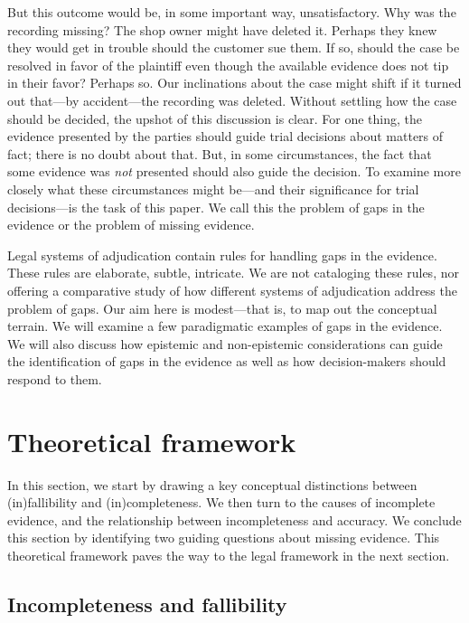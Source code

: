 \documentclass[
  10pt,
  dvipsnames,enabledeprecatedfontcommands]{scrartcl}
\begin{document}
But this outcome would be, in some important way, unsatisfactory. Why
was the recording missing? The shop owner might have deleted it. Perhaps
they knew they would get in trouble should the customer sue them. If so,
should the case be resolved in favor of the plaintiff even though the
available evidence does not tip in their favor? Perhaps so. Our
inclinations about the case might shift if it turned out that---by
accident---the recording was deleted. Without settling how the case
should be decided, the upshot of this discussion is clear. For one
thing, the evidence presented by the parties should guide trial
decisions about matters of fact; there is no doubt about that. But, in
some circumstances, the fact that some evidence was \textit{not}
presented should also guide the decision. To examine more closely what
these circumstances might be---and their significance for trial
decisions---is the task of this paper. We call this the problem of gaps
in the evidence or the problem of missing evidence.

Legal systems of adjudication contain rules for handling gaps in the
evidence. These rules are elaborate, subtle, intricate. We are not
cataloging these rules, nor offering a comparative study of how
different systems of adjudication address the problem of gaps. Our aim
here is modest---that is, to map out the conceptual terrain. We will
examine a few paradigmatic examples of gaps in the evidence. We will
also discuss how epistemic and non-epistemic considerations can guide
the identification of gaps in the evidence as well as how
decision-makers should respond to them.

\hypertarget{theoretical-framework}{%
\section{Theoretical framework}\label{theoretical-framework}}

In this section, we start by drawing a key conceptual distinctions
between (in)fallibility and (in)completeness. We then turn to the causes
of incomplete evidence, and the relationship between incompleteness and
accuracy. We conclude this section by identifying two guiding questions
about missing evidence. This theoretical framework paves the way to the
legal framework in the next section.

\hypertarget{incompleteness-and-fallibility}{%
\subsection{Incompleteness and
fallibility}\label{incompleteness-and-fallibility}}
\end{document}
